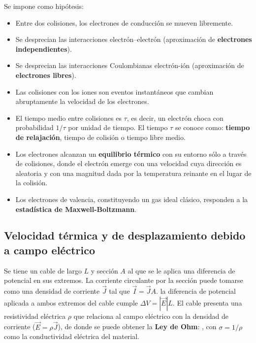 \documentclass[oneside]{book}
\numberwithin{equation}{section}
\numberwithin{figure}{section}
\numberwithin{table}{section}
\begin{document}
			Se impone como hipótesis:\\
			
			\begin{itemize}
				\item Entre dos colisiones, los electrones de conducción se mueven libremente.
				\item Se desprecian las interacciones electrón–electrón (aproximación de \textbf{electrones independientes}).
				\item Se desprecian las interacciones Coulombianas electrón-ión (aproximación de \textbf{electrones libres}).
				\item Las colisiones con los iones son eventos instantáneos que cambian abruptamente la velocidad de los electrones.
				\item El tiempo medio entre colisiones es $\tau$, es decir, un electrón choca con probabilidad $1/\tau$ por unidad de tiempo. El tiempo $\tau$ se conoce como: \textbf{tiempo de relajación}, tiempo de colisión o tiempo libre medio.
				\item Los electrones alcanzan un \textbf{equilibrio térmico} con su entorno sólo a través de colisiones, donde el electrón emerge con una velocidad cuya dirección es aleatoria y con una magnitud dada por la temperatura reinante en el lugar de la colisión.
				\item Los electrones de valencia, constituyendo un gas ideal clásico, responden a la \textbf{estadística de Maxwell-Boltzmann}.
			\end{itemize}					

			\subsection{Velocidad térmica y de desplazamiento debido a campo eléctrico}
			
				Se tiene un cable de largo $L$ y sección $A$ al que se le aplica una diferencia de potencial en sus extremos. La corriente circulante por la sección puede tomarse como una densidad de corriente $\vec{J}$ tal que $\vec{I}=\vec{J}A$. la diferencia de potencial aplicada a ambos extremos del cable cumple $\Delta V= |\vec{E}| L$. El cable presenta una resistividad eléctrica $\rho$ que relaciona al campo eléctrico con la densidad de corriente ($\vec{E}=\rho \vec{J}$), de donde se puede obtener la \textbf{Ley de Ohm}: , con $\sigma=1/\rho$ como la conductividad eléctrica del material.\\
				
\end{document}
